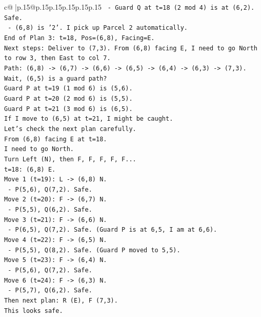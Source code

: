 \documentclass{article}
\begin{document}
{\begin{supertabular}{c@{$\;$}|p{.15\linewidth}@{}p{.15\linewidth}p{.15\linewidth}p{.15\linewidth}p{.15\linewidth}p{.15\linewidth}}
{{{\texttt{  {-} Guard Q at t=18 (2 mod 4) is at (6,2). Safe.} \\
\texttt{  {-} (6,8) is '2'. I pick up Parcel 2 automatically.} \\
\texttt{End of Plan 3: t=18, Pos=(6,8), Facing=E.} \\
\texttt{Next steps: Deliver to (7,3). From (6,8) facing E, I need to go North to row 3, then East to col 7.} \\
\texttt{Path: (6,8) {-}> (6,7) {-}> (6,6) {-}> (6,5) {-}> (6,4) {-}> (6,3) {-}> (7,3).} \\
\texttt{Wait, (6,5) is a guard path?} \\
\texttt{Guard P at t=19 (1 mod 6) is (5,6).} \\
\texttt{Guard P at t=20 (2 mod 6) is (5,5).} \\
\texttt{Guard P at t=21 (3 mod 6) is (6,5).} \\
\texttt{If I move to (6,5) at t=21, I might be caught.} \\
\texttt{Let's check the next plan carefully.} \\
\texttt{From (6,8) facing E at t=18.} \\
\texttt{I need to go North.} \\
\texttt{Turn Left (N), then F, F, F, F, F...} \\
\texttt{t=18: (6,8) E.} \\
\texttt{Move 1 (t=19): L {-}> (6,8) N.} \\
\texttt{  {-} P(5,6), Q(7,2). Safe.} \\
\texttt{Move 2 (t=20): F {-}> (6,7) N.} \\
\texttt{  {-} P(5,5), Q(6,2). Safe.} \\
\texttt{Move 3 (t=21): F {-}> (6,6) N.} \\
\texttt{  {-} P(6,5), Q(7,2). Safe. (Guard P is at 6,5, I am at 6,6).} \\
\texttt{Move 4 (t=22): F {-}> (6,5) N.} \\
\texttt{  {-} P(5,5), Q(8,2). Safe. (Guard P moved to 5,5).} \\
\texttt{Move 5 (t=23): F {-}> (6,4) N.} \\
\texttt{  {-} P(5,6), Q(7,2). Safe.} \\
\texttt{Move 6 (t=24): F {-}> (6,3) N.} \\
\texttt{  {-} P(5,7), Q(6,2). Safe.} \\
\texttt{Then next plan: R (E), F (7,3).} \\
\texttt{This looks safe.} \\
}}}
\end{supertabular}}
\end{document}
